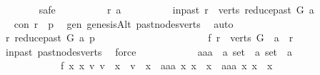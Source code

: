 \begin{isabellebody}
\ \ \ \ \ \ \isamarkupfalse%
\ safe\isanewline
\ \ \ \ \ \ \ \ \isamarkupfalse%
\ r\ a\isanewline
\ \ \ \ \ \ \ \ \isamarkupfalse%
\ in{\isacharunderscore}{\kern0pt}past{\isacharcolon}{\kern0pt}\ {\isachardoublequoteopen}r\ {\isasymin}\ verts\ {\isacharparenleft}{\kern0pt}reduce{\isacharunderscore}{\kern0pt}past\ G\ a{\isacharparenright}{\kern0pt}{\isachardoublequoteclose}\isanewline
\ \ \ \ \ \ \ \ \isamarkupfalse%
\ \isamarkupfalse%
\ con{\isacharcolon}{\kern0pt}\ {\isachardoublequoteopen}r\ {\isasymrightarrow}\isactrlsup {\isacharasterisk}{\kern0pt}\ p{\isachardoublequoteclose}\ \isamarkupfalse%
\ gen\ genesisAlt\ past{\isacharunderscore}{\kern0pt}nodes{\isacharunderscore}{\kern0pt}verts\ \isamarkupfalse%
\ auto\ \ \isanewline
\ \ \ \ \ \ \ \ \isamarkupfalse%
\ \isamarkupfalse%
\ {\isachardoublequoteopen}r\ {\isasymrightarrow}\isactrlsup {\isacharasterisk}{\kern0pt}\isactrlbsub reduce{\isacharunderscore}{\kern0pt}past\ G\ a\isactrlesub \ p{\isachardoublequoteclose}\isanewline
\ \ \ \ \ \ \ \ \isamarkupfalse%
\ {\isacharminus}{\kern0pt}\isanewline
\ \ \ \ \ \ \ \ \ \ \isamarkupfalse%
\ f{}{\isacharcolon}{\kern0pt}\ {\isachardoublequoteopen}r\ {\isasymin}\ verts\ G\ {\isasymand}\ a\ {\isasymrightarrow}\isactrlsup {\isacharplus}{\kern0pt}\ r{\isachardoublequoteclose}\isanewline
\ \ \ \ \ \ \ \ \ \ \ \ \isamarkupfalse%
\ in{\isacharunderscore}{\kern0pt}past\ past{\isacharunderscore}{\kern0pt}nodes{\isacharunderscore}{\kern0pt}verts\ \isamarkupfalse%
\ force\isanewline
\ \ \ \ \ \ \ \ \ \ \isamarkupfalse%
\ aaa\ {\isacharcolon}{\kern0pt}{\isacharcolon}{\kern0pt}\ {\isachardoublequoteopen}{\isacharprime}{\kern0pt}a\ set\ {\isasymRightarrow}\ {\isacharprime}{\kern0pt}a\ set\ {\isasymRightarrow}\ {\isacharprime}{\kern0pt}a{\isachardoublequoteclose}\ \isanewline
\ \ \ \ \ \ \ \ \ \ \ \ f{}{\isacharcolon}{\kern0pt}\ {\isachardoublequoteopen}{\isasymforall}x{}\ x{}{\isachardot}{\kern0pt}\ {\isacharparenleft}{\kern0pt}{\isasymexists}v{}{\isachardot}{\kern0pt}\ v{}\ {\isasymin}\ x{}\ {\isasymand}\ v{}\ {\isasymnotin}\ x{}{\isacharparenright}{\kern0pt}\ {\isacharequal}{\kern0pt}\ {\isacharparenleft}{\kern0pt}aaa\ x{}\ x{}\ {\isasymin}\ x{}\ {\isasymand}\ aaa\ x{}\ x{}\ {\isasymnotin}\ x{}{\isacharparenright}{\kern0pt}{\isachardoublequoteclose}\isanewline

\end{isabellebody}
